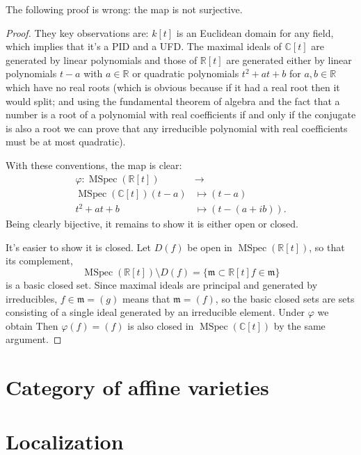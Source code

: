 \noindent
The following proof is wrong: the map
is not surjective.

\begin{proof}
They key observations are: $k[t]$ is an
Euclidean domain for any field, which
implies that it's a PID and a UFD.
The maximal ideals of $\mathbb{C}[t]$
are generated by linear polynomials
and those of $\mathbb{R}[t]$ are generated
either by linear polynomials
$t-a$ with $a \in \mathbb{R}$
or quadratic polynomials
$t^2+at+b$ for $a,b \in \mathbb{R}$ which
have no real roots
(which is obvious because if it had
a real root then it would split;
and using the fundamental theorem
of algebra and the fact that a number is
a root of a
polynomial with real coefficients
if and only if the conjugate is also
a root we can prove that any irreducible
polynomial with real coefficients
must be at most quadratic).

With these conventions, the map is clear:
$$
\begin{aligned}
\varphi: \operatorname{MSpec}(\mathbb{R}[t])
&\longrightarrow \\
\operatorname{MSpec}(\mathbb{C}[t])
(t-a) &\longmapsto(t-a)\\
t^2+at+b& \longmapsto (t-(a+ib)).
\end{aligned}
$$
Being clearly bijective, it remains
to show it is either open or closed.

It's easier to show it is closed.
Let $D(f)$ be open in
$\operatorname{MSpec}(\mathbb{R}[t])$,
so that its complement,
$$
\operatorname{MSpec}(\mathbb{R}[t])\setminus
D(f)
=\{\mathfrak{m} \subset \mathbb{R}[t]
f \in \mathfrak{m}\}
$$
is a basic closed set. 
Since maximal
ideals are principal and generated
by irreducibles, $f \in \mathfrak{m}=(g)$
means that $\mathfrak{m}=(f)$,
so the basic closed sets are sets
consisting of a single ideal
generated by an irreducible element.
Under $\varphi$
we obtain
Then $\varphi(f)=(f)$ is also closed
in $\operatorname{MSpec}(\mathbb{C}[t])$
by the same argument.
\end{proof}

\section{Category of affine varieties}
\label{section-category-affine-varieties}

\section{Localization}
\label{section-localization}

